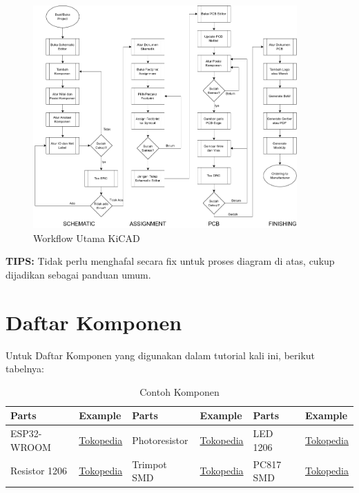 \documentclass[12pt]{book}
\begin{document}
	\begin{figure}[!ht]
		\centering
		\includegraphics[width=0.9\textwidth]{images/main/kicad_workflow}
		\caption{Workflow Utama KiCAD}
	\end{figure}

	\textbf{TIPS:} Tidak perlu menghafal secara fix untuk proses diagram di atas, cukup dijadikan sebagai panduan umum.

	\section{Daftar Komponen}

	Untuk Daftar Komponen yang digunakan dalam tutorial kali ini, berikut tabelnya:\\

	\begin{table}[h!]
	\begin{center}
		\begin{tabular}{|l|l|l|l|l|l|}
		\toprule
		Parts & Example & Parts & Example & Parts & Example \\
		\midrule
		ESP32-WROOM & \href{https://www.tokopedia.com/akhishop/esp-32-esp-32s-esp-wroom-32-wifi-bluetooth-dual-core-chip}{Tokopedia} &
		Photoresistor & \href{https://www.tokopedia.com/ardushopid/sensor-cahaya-photoresistor-ldr-arduino}{Tokopedia} &
		LED 1206 & \href{https://www.tokopedia.com/alef/led-1206-smd-putih-white-lampu}{Tokopedia} \\
		\midrule
		Resistor 1206 & \href{https://www.tokopedia.com/isee/resistor-smd-1206-10kohm-10k-10-kilo-ohm-toleransi-1-tolerance-1}{Tokopedia} &
		Trimpot SMD & \href{https://www.tokopedia.com/digiware/vr-500k-ohm-singleturn-3314j-variable-resistor-trimpot-smd}{Tokopedia} &
		PC817 SMD & \href{https://www.tokopedia.com/putraniagabdg/pc817-smd-optocoupler-pc-817-sop-4pin-el817-pc817-1-high-quality}{Tokopedia} \\
		\bottomrule
		\end{tabular}
		\caption{Contoh Komponen}
	\end{center}
	\end{table}
\end{document}
